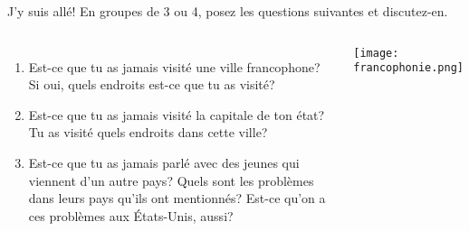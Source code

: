 \begin{frame}{J'y suis allé!}
  En groupes de 3 ou 4, posez les questions suivantes et discutez-en.
  \begin{columns}
      \small
      \begin{enumerate}
        \item Est-ce que tu as jamais visité une ville francophone? Si oui, quels endroits est-ce que tu as visité?
        \item Est-ce que tu as jamais visité la capitale de ton état? Tu as visité quels endroits dans cette ville?
        \item Est-ce que tu as jamais parlé avec des jeunes qui viennent d'un autre pays? Quels sont les problèmes dans leurs pays qu'ils ont mentionnés? Est-ce qu'on a ces problèmes aux États-Unis, aussi?
      \end{enumerate}
      \begin{center}
        \texttt{[image: francophonie.png]}
      \end{center}
  \end{columns}
\end{frame}